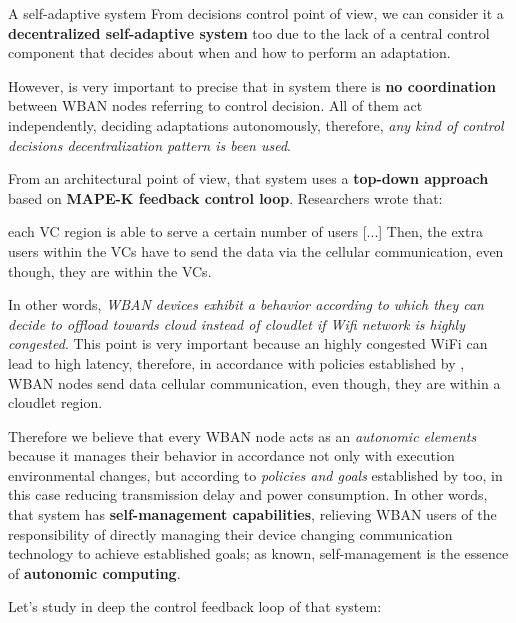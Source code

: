 \documentclass[10pt]{beamer}
\begin{document}
\begin{frame}{A self-adaptive system}
From decisions control point of view, we can consider it a \textbf{decentralized self-adaptive system} too due to the lack of a central control component that decides about when and how to perform an adaptation.\cite{PatternsDecentralizedSelf} 

However, is very important to precise that in \citet{MSAReport} system there is \textbf{no coordination} between WBAN nodes referring to control decision. All  of them act independently, deciding adaptations autonomously, therefore, \textit{any kind of control decisions decentralization pattern is been used}.  

From an architectural point of view, that system uses a \textbf{top-down approach} based on \textbf{MAPE-K feedback control loop}. Researchers wrote that:

\vspace{0.3cm}

\begin{quoting}[font=itshape, begintext={``}, endtext={''\cite[par.~5.1]{MSAReport}}]
each VC region is able to serve a certain number of users [...] Then, the extra users within the VCs have to send the data via the cellular communication, even though, they are within the VCs. 
\end{quoting}

\vspace{0.3cm}

In other words, \textit{WBAN devices exhibit a behavior according to which they can decide to offload towards cloud instead of cloudlet if Wifi network is highly congested}. This point is very important because an highly congested WiFi can lead to high latency, therefore, in accordance with policies established by \citet{MSAReport}, WBAN nodes  send data cellular communication, even though, they are within a cloudlet region.  

Therefore we believe that every WBAN node acts as an \textit{autonomic elements} because it manages their behavior in accordance not only with execution environmental changes, but according to \textit{policies and goals} established by \citet{MSAReport} too, in this case reducing transmission delay and power consumption. In other words, that system has \textbf{self-management capabilities}, relieving WBAN users of the responsibility of directly managing their device changing communication technology to achieve established goals; as known, self-management is the essence of \textbf{autonomic computing}.\cite{visionOf} 

Let's study in deep the control feedback loop of that system:
\begin{description}


\end{description}
\end{frame}
\end{document}
